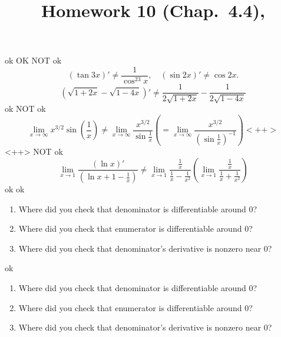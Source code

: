 \documentclass[10pt]{article} %
\title{Homework 10 (Chap.~4.4),
}
\begin{document}
\maketitle


ok
OK
NOT ok
\begin{equation*}
	\left( \tan 3x \right)'\neq \frac{1}{\cos^23x},\quad
	\left( \sin 2x \right)'\neq \cos 2x.
\end{equation*}
\begin{equation*}
	\left( 
	\sqrt{1+2x}-\sqrt{1-4x}
	\right)'\neq\frac{1}{2\sqrt{1+2x}}-\frac{1}{2\sqrt{1-4x}}
\end{equation*}
ok
NOT ok
\begin{equation*}
	\lim_{x\to\infty}x^{3/2}\sin\left( \frac{1}{x} \right)
	\neq\lim_{x\to\infty}\frac{x^{3/2}}{\sin\frac{1}{x}}\left( 
		=\lim_{x\to\infty}\frac{x^{3/2}}{\left( \sin\frac{1}{x} \right)^{-1}}
	\right)<++>
\end{equation*}<++>
NOT ok
\begin{equation*}
	\lim_{x\to1}\frac{\left( \ln x \right)'}{\left( \ln x+1-\frac{1}{x} \right)}\neq
	\lim_{x\to1}\frac{\frac{1}{x}}{\frac{1}{x}-\frac{1}{x^2}}\left( 
		\lim_{x\to1}\frac{\frac{1}{x}}{\frac{1}{x}+\frac{1}{x^2}}
	\right)
\end{equation*}
ok
ok
\begin{enumerate}
	\item 
		Where did you check that denominator is differentiable around 0?
	\item 
		Where did you check that  enumerator is differentiable around 0?
	\item Where did you check that denominator's derivative is nonzero near 0?
\end{enumerate}
ok
\begin{enumerate}
	\item 
		Where did you check that denominator is differentiable around 0?
	\item 
		Where did you check that  enumerator is differentiable around 0?
	\item Where did you check that denominator's derivative is nonzero near 0?
\end{enumerate}
\end{document}
